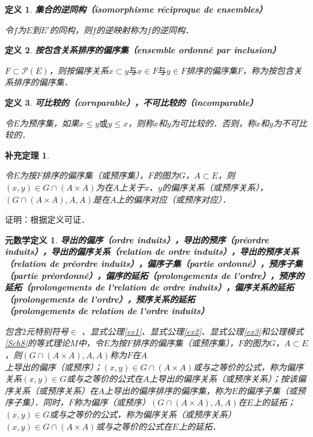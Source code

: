 \documentclass[12pt, a4paper, oneside]{book}
\newtheorem{metadef}{元数学定义}
\newtheorem{cor}{补充定理}
\newtheorem{de}{定义}
\begin{document}
			\begin{de}
				\textbf{集合的逆同构（isomorphisme réciproque de ensembles）}
				\par
				令$f$为$E$到$E'$的同构，则$f$的逆映射称为$f$的逆同构．
			\end{de}

			\begin{de}
				\textbf{按包含关系排序的偏序集（ensemble ordonné par inclusion）}
				\par
				$F\subset \mathcal{P}(E)$，则按偏序关系$x\subset y\text{与}x\in F\text{与}y\in F$排序的偏序集$F$，称为按包含关系排序的偏序集．
			\end{de}

			\begin{de}
				\textbf{可比较的（cornparable），不可比较的（incomparable）}
				\par
				令$E$为预序集，如果$x\leq y\text{或}y\leq x$，则称$x$和$y$为可比较的．否则，称$x$和$y$为不可比较的．
			\end{de}

			\begin{cor}\label{cor158}
				\hfill\par
				令$E$为按$F$排序的偏序集（或预序集），$F$的图为$G$，$A\subset E$，则$(x, y)\in G\cap(A\times A)$为在$A$上关于$x$、$y$的偏序关系（或预序关系），$(G\cap(A\times A), A, A)$是在$A$上的偏序对应（或预序对应）．
			\end{cor}
			证明：根据定义可证．
						
			\begin{metadef}
				\textbf{导出的偏序（ordre induits），导出的预序（préordre induits），导出的偏序关系（relation de ordre induits），导出的预序关系（relation de préordre induits），偏序子集（partie ordonné），预序子集（partie préordonné），偏序的延拓（prolongements de l'ordre），预序的延拓（prolongements de l'relation de ordre induits），偏序关系的延拓（prolongements de l'ordre），预序关系的延拓\\（prolongements de relation de l'ordre induits）}
				\par
				包含$2$元特别符号$\in$ 、显式公理\ref{ex1}、显式公理\ref{ex2}、显式公理\ref{ex3}和公理模式\ref{Sch8}的等式理论$M$中，令$E$为按$F$排序的偏序集（或预序集），$F$的图为$G$，$A\subset E$，则$(G\cap (A\times A), A, A)$称为$F$在$A$\\上导出的偏序（或预序）；$(x, y)\in G\cap(A\times A)$或与之等价的公式，称为偏序关系$(x, y)\in G$或与之等价的公式在$A$上导出的偏序关系（或预序关系）；按该偏序关系（或预序关系）在$A$上导出的偏序排序的偏序集，称为$E$的偏序子集（或预序子集）．同时，$F$称为偏序（或预序）$(G\cap(A\times A), A, A)$在$E$上的延拓；$(x, y)\in G$或与之等价的公式，称为偏序关系（或预序关系）$(x, y)\in G\cap(A\times A)$或与之等价的公式在$E$上的延拓．
			\end{metadef}
			
\end{document}
